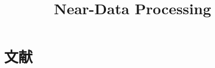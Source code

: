 \documentclass{article}
\title{Near-Data Processing}
\date{}
\begin{document}
\maketitle

\tableofcontents
\newpage
\part{文献}


%
\end{document}
